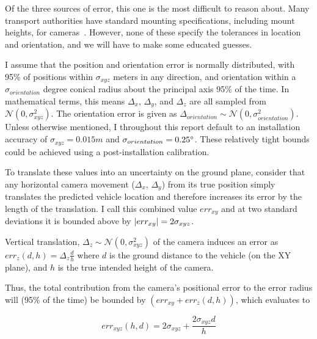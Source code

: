 \documentclass[a4paper,12pt,twoside,openright]{report}
\begin{document}
Of the three sources of error, this one is the most difficult to reason about. 
Many transport authorities have standard mounting specifications, including mount heights, for cameras~\cite{StreetscapeGuideance}.
However, none of these specify the tolerances in location and orientation, and we will have to make some educated guesses.

I assume that the position and orientation error is normally distributed, with
95\% of positions within $\sigma_{xyz}$ meters in any direction, 
and orientation within a $\sigma_{orientation}$ degree conical radius about the principal axis 95\% of the time.
In mathematical terms, this means $\Delta_{x}$, $\Delta_{y}$, and $\Delta_{z}$ 
are all sampled from $\mathcal{N}(0, \sigma_{xyz}^2)$. The orientation error is given as
$\Delta_{orientation} \sim \mathcal{N}(0, \sigma_{orientation}^2)$.
Unless otherwise mentioned, I throughout this report default to an installation accuracy of
$\sigma_{xyz} = 0.015m$ and $\sigma_{orientation} = 0.25\degree$. These relatively
tight bounds could be achieved using a post-installation calibration.



To translate these values into an uncertainty on the ground plane, consider that
any horizontal camera movement ($\Delta_{x}$, $\Delta_{y}$) from its true position simply translates
the predicted vehicle location and therefore increases its error by the length of the translation.
I call this combined value $err_{xy}$ and at two standard deviations it is bounded above by
$\abs{err_{xy}} = 2\sigma_{xyz}$.

Vertical translation, $\Delta_z\sim \mathcal{N}(0, \sigma_{xyz}^2)$
of the camera induces an error as $err_{z}(d, h) = \Delta_z \frac{d}{h}$ %
where $d$ is the ground distance to the vehicle (on the XY plane), and $h$ is the true intended
height of the camera.

Thus, the total contribution from the camera's positional error to the error radius
will (95\% of the time) be bounded by $(err_{xy} + err_{z}(d, h))$, which evaluates to

\[ err_{xyz}(h, d) = 2\sigma_{xyz} + \frac{2\sigma_{xyz}d}{h} \]
\end{document}
